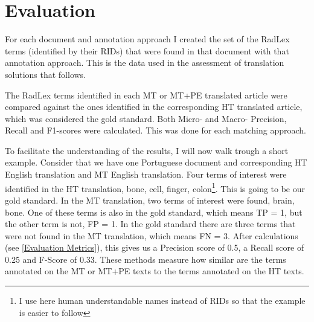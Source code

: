 \section{Evaluation}

For each document and annotation approach I created the set of the RadLex terms (identified by their RIDs) that were found in that document with that annotation approach. This is the data used in the assessment of translation solutions that follows.

The RadLex terms identified in each MT or MT+PE translated article were compared against the ones identified in the corresponding HT translated article, which was considered the gold standard. Both Micro- and Macro- Precision, Recall and F1-scores were calculated. This was done for each matching approach. 

To facilitate the understanding of the results, I will now walk trough a short example. Consider that we have one Portuguese document and corresponding HT English translation and MT English translation. Four terms of interest were identified in the HT translation, {bone, cell, finger, colon}\footnote{I use here human understandable names instead of RIDs so that the example is easier to follow}. This is going to be our gold standard. In the MT translation, two terms of interest were found, {brain, bone}. One of these terms is also in the gold standard, which means TP = 1, but the other term is not, FP = 1. In the gold standard there are three terms that were not found in the MT translation, which means FN = 3. After calculations (see \ref{Evaluation Metrics}), this gives us a Precision score of 0.5, a Recall score of 0.25 and F-Score of 0.33. These methods measure how similar are the terms annotated on the MT or MT+PE texts to the terms annotated on the HT texts.




 